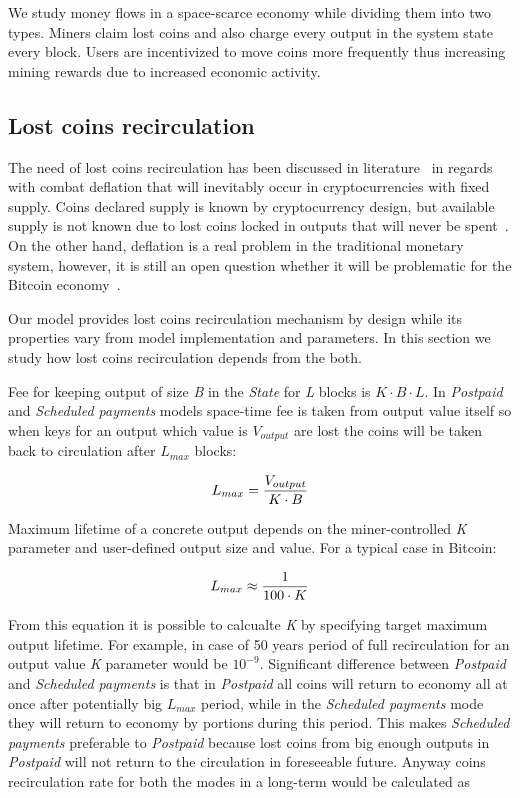 \documentclass[]{llncs}   %
\newcommand{\state}{\textit{State}}
\begin{document}
We study money flows in a space-scarce economy while dividing them into two types. Miners claim lost coins and also charge every output in the system state every block. Users are incentivized to move coins more frequently thus increasing mining rewards due to increased economic activity.  

\subsection{Lost coins recirculation}
\label{sec:re}

The need of lost coins recirculation has been discussed in literature~\cite{gjermundrod2014recirculating,gjermundrod2016going} in regards with combat deflation that will inevitably occur in cryptocurrencies with fixed supply. Coins declared supply is known by cryptocurrency design, but available supply is not known due to lost coins locked in outputs that will never be spent~\cite{ron2013quantitative}. On the other hand, deflation is a real problem in the traditional monetary system, however, it is still an open question whether it will be problematic for the Bitcoin economy~\cite{bitcoinDeflationarySpiral,barber2012bitter}.


Our model provides lost coins recirculation mechanism by design while its properties vary from model implementation and parameters. In this section we study how lost coins recirculation depends from the both.

Fee for keeping output of size \textit{B} in the \state{} for \textit{L} blocks is ${K \cdot B \cdot L}$. In \textit{Postpaid} and \textit{Scheduled payments} models space-time fee is taken from output value itself so when keys for an output which value is \textit{$V_{output}$} are lost the coins will be taken back to circulation after \textit{$L_{max}$} blocks: 

\begin{equation}
{L_{max} = {V_{output} \over K \cdot B}}
\end{equation}

Maximum lifetime of a concrete output depends on the miner-controlled \textit{K} parameter and user-defined output size and value. For a typical case in Bitcoin:

\begin{equation}
{L_{max} \approx {1 \over 100 \cdot K}}
\end{equation}

From this equation it is possible to calcualte \textit{K} by specifying target maximum output lifetime. For example, in case of 50 years period of full recirculation for an output value \textit{K} parameter would be $10^{-9}$. Significant difference between \textit{Postpaid} and \textit{Scheduled payments} is that in \textit{Postpaid} all coins will return to economy all at once after potentially big $L_{max}$ period, while in the \textit{Scheduled payments} mode they will return to economy by portions during this period. This makes \textit{Scheduled payments} preferable to \textit{Postpaid} because lost coins from big enough outputs in \textit{Postpaid} will not return to the circulation in foreseeable future. Anyway coins recirculation rate for both the modes in a long-term would be calculated as
\end{document}

